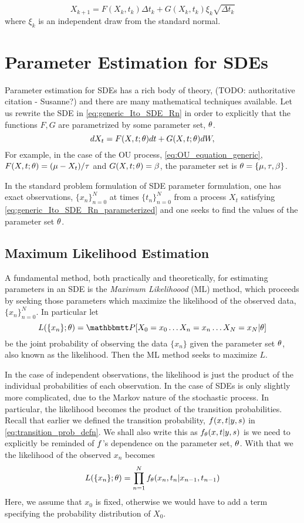 \begin{equation}
X_{k+1} = F(X_k,t_k)  \Delta t_k   + G(X_k,t_k) \xi_k \sqrt{\Delta t_k }
\label{eq:euler_maruyama_discretization_generic_Ito_SDE}
\end{equation}
where $\xi_k$ is an independent draw from the standard normal. 


\section{Parameter Estimation for SDEs}
\label{sec:estimation}
Parameter estimation for SDEs has a rich body of theory, (TODO: authoritative
citation - Susanne?)  and there are many mathematical techniques
available. Let us rewrite the SDE in \cref{eq:generic_Ito_SDE_Rn} in order to explicitly that the 
functions $F, G$ are parametrized by some parameter set, ${ \theta}$.
\begin{equation}
dX_t = F(X,t;{ \theta}) dt + G(X,t;{ \theta}) dW,
\label{eq:generic_Ito_SDE_Rn_parameterized}
\end{equation}
For example, in the case of the OU process, \cref{eq:OU_equation_generic},
$F(X,t;{ \theta}) = ({\mu } - {X_t})/{{ \tau }}$ and $G(X,t;{ \theta}) = \beta$, the
parameter set is ${ \theta} = \{{\mu }, { \tau }, \beta\}$.

In the standard problem formulation of SDE parameter formulation, one has exact
observations, $\{x_n\}_{n=0}^N$ at times $\{t_n\}_{n=0}^N$ from a process $X_t$
satisfying \cref{eq:generic_Ito_SDE_Rn_parameterized} and one seeks to find the
values of the parameter set ${ \theta}$.

\subsection{Maximum Likelihood Estimation}
A fundamental method, both
practically and theoretically, for estimating parameters in an SDE is the {\sl Maximum
Likelihoood} (ML) method, which proceeds by seeking those parameters which
maximize the likelihood of the observed data, $\{x_n\}_{n=0}^N$. In particular
let $$L(\{x_n\}; \th) = \Prob[ X_0 = x_0\ldots X_n = x_n\ldots X_N = x_N |
\th]$$ be the joint probability of observing the data $\{x_n\}$ given the
parameter set ${ \theta}$, also known as the likelihood. Then the ML method seeks to
maximize $L$.

In the case of independent observations, the
likelihood is just the product of the individual probabilities of each observation. In the case of SDEs is only
slightly more complicated, due to the Markov nature of the stochastic process. In particular,
the likelihood becomes the product of the transition probabilities. Recall that
earlier we defined the transition probability, ${f}(x,t| y,s)$ in
\cref{eq:transition_prob_defn}. We shall also write this as ${f}_{ \theta}(x,t|
y,s)$ is we need to explicitly be reminded of ${f}$'s dependence on the
parameter set, ${ \theta}$. With that we the likelihood of the observed $x_n$
becomes
\begin{equation}
L(\{x_n\}; { \theta}) = \prod_{n=1}^{N} f_{ \theta}(x_n, t_n| x_{n-1}, t_{n-1})
\label{eq:SDE_discrete_likelihood}
\end{equation}
Here, we assume that $x_0$ is fixed, otherwise we would have to add a term
specifying the probability distribution of $X_0$.

